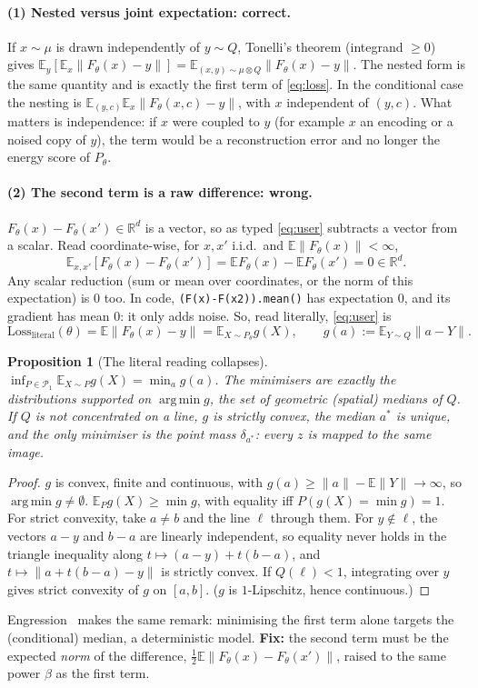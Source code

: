 \documentclass[11pt]{article}
\newtheorem{proposition}[theorem]{Proposition}
\theoremstyle{definition}
\theoremstyle{remark}
\newcommand{\R}{\mathbb{R}}
\newcommand{\E}{\mathbb{E}}
\newcommand{\Pb}{\mathcal{P}}
\newcommand{\norm}[1]{\lVert #1\rVert}
\DeclareMathOperator*{\argmin}{arg\,min}
\begin{document}
\paragraph{(1) Nested versus joint expectation: correct.} If $x\sim\mu$ is drawn independently of $y\sim Q$,
Tonelli's theorem (integrand $\ge0$) gives
$\E_y[\E_x\norm{F_\theta(x)-y}]=\E_{(x,y)\sim\mu\otimes Q}\norm{F_\theta(x)-y}$. The nested form is the same
quantity and is exactly the first term of \eqref{eq:loss}. In the conditional case the nesting is
$\E_{(y,c)}\E_x\norm{F_\theta(x,c)-y}$, with $x$ independent of $(y,c)$. What matters is independence: if $x$
were coupled to $y$ (for example $x$ an encoding or a noised copy of $y$), the term would be a reconstruction
error and no longer the energy score of $P_\theta$.

\paragraph{(2) The second term is a raw difference: wrong.} $F_\theta(x)-F_\theta(x')\in\R^d$ is a vector,
so as typed \eqref{eq:user} subtracts a vector from a scalar. Read coordinate-wise, for $x,x'$ i.i.d.\ and
$\E\norm{F_\theta(x)}<\infty$,
\[
\E_{x,x'}[F_\theta(x)-F_\theta(x')]=\E F_\theta(x)-\E F_\theta(x')=0\in\R^d .
\]
Any scalar reduction (sum or mean over coordinates, or the norm of this expectation) is $0$ too. In code,
\texttt{(F(x)-F(x2)).mean()} has expectation $0$, and its gradient has mean $0$: it only adds noise. So,
read literally, \eqref{eq:user} is
\[
\mathrm{Loss}_{\mathrm{literal}}(\theta)=\E\norm{F_\theta(x)-y}=\E_{X\sim P_\theta}g(X),\qquad g(a):=\E_{Y\sim Q}\norm{a-Y}.
\]
\begin{proposition}[The literal reading collapses]\label{prop:collapse}
$\inf_{P\in\Pb_1}\E_{X\sim P}g(X)=\min_a g(a)$. The minimisers are exactly the distributions supported on
$\argmin g$, the set of geometric (spatial) medians of $Q$. If $Q$ is not concentrated on a line, $g$ is strictly
convex, the median $a^\ast$ is unique, and the only minimiser is the point mass $\delta_{a^\ast}$: every $z$
is mapped to the same image.
\end{proposition}
\begin{proof}
$g$ is convex, finite and continuous, with $g(a)\ge\norm{a}-\E\norm{Y}\to\infty$, so $\argmin g\neq\emptyset$.
$\E_Pg(X)\ge\min g$, with equality iff $P(g(X)=\min g)=1$. For strict convexity, take $a\neq b$ and the line
$\ell$ through them. For $y\notin\ell$, the vectors $a-y$ and $b-a$ are linearly independent, so equality never
holds in the triangle inequality along $t\mapsto(a-y)+t(b-a)$, and $t\mapsto\norm{a+t(b-a)-y}$ is strictly
convex. If $Q(\ell)<1$, integrating over $y$ gives strict convexity of $g$ on $[a,b]$. ($g$ is $1$-Lipschitz,
hence continuous.)
\end{proof}
Engression~\cite[Sec.~2.3]{SM2025} makes the same remark: minimising the first term alone targets the
(conditional) median, a deterministic model. \textbf{Fix:} the second term must be the expected
\emph{norm} of the difference, $\tfrac12\E\norm{F_\theta(x)-F_\theta(x')}$, raised to the same power $\beta$
as the first term.
\end{document}
